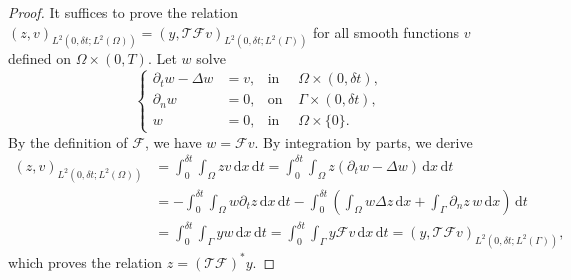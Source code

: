 \documentclass[onefignum,onetabnum]{siamart190516}
\numberwithin{equation}{section}
\begin{document}
\begin{proof}
It suffices to prove the relation $( z, v )_{L^{2}(0, \delta t; L^{2}(\Omega))} = ( y, \mathcal{T}\mathcal{F} v )_{L^{2}(0, \delta t; L^{2}(\Gamma))}$ for all smooth functions $v$ defined on $\Omega\times(0,T)$.
Let $w$ solve
\begin{equation*}
\left\{
\begin{aligned}
\partial_{t} w - \Delta w &= v, & \text{in }& \Omega \times (0, \delta t), \\
{\partial_n} w &= 0, & \text{on }& \Gamma \times (0, \delta t), \\
w &= 0, & \text{in }& \Omega \times \{0\}.
\end{aligned}
\right.
\end{equation*}
By the definition of $\mathcal{F}$, we have $w = \mathcal{F} v$.
By integration by parts, we derive
\begin{align*}
( z, v )_{L^{2}(0, \delta t; L^{2}(\Omega))} &= \int_{0}^{\delta t} \int_{\Omega} z v \, \mathrm{d}x \, \mathrm{d}t = \int_{0}^{\delta t} \int_{\Omega} z \left(\partial_{t} w - \Delta w\right) \, \mathrm{d}x \, \mathrm{d}t \\
&= -\int_{0}^{\delta t} \int_{\Omega} w \partial_{t} z \, \mathrm{d}x \, \mathrm{d}t - \int_{0}^{\delta t} \left(\int_{\Omega} w \Delta z \, \mathrm{d}x + \int_{ \Gamma} {\partial_n} z \, w \, \mathrm{d}x\right) \, \mathrm{d}t \\
&= \int_{0}^{\delta t} \int_{ \Gamma} y w \, \mathrm{d}x \, \mathrm{d}t = \int_{0}^{\delta t} \int_{ \Gamma} y \mathcal{F} v \, \mathrm{d}x \, \mathrm{d}t
= ( y, \mathcal{T}\mathcal{F} v )_{L^{2}(0, \delta t; L^{2}(\Gamma))},
\end{align*}
which proves the relation $z = (\mathcal{T}\mathcal{F})^{*} y$.
\end{proof}
\end{document}
